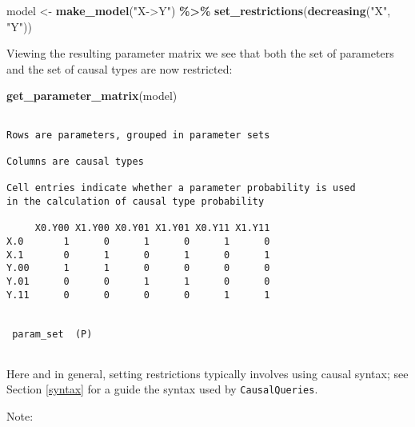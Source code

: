 \documentclass[
  12pt,
]{book}
\newenvironment{Shaded}{\begin{snugshade}}{\end{snugshade}}
\newcommand{\FunctionTok}[1]{\textcolor[rgb]{0.13,0.29,0.53}{\textbf{#1}}}
\newcommand{\NormalTok}[1]{#1}
\newcommand{\OtherTok}[1]{\textcolor[rgb]{0.56,0.35,0.01}{#1}}
\newcommand{\SpecialCharTok}[1]{\textcolor[rgb]{0.81,0.36,0.00}{\textbf{#1}}}
\newcommand{\StringTok}[1]{\textcolor[rgb]{0.31,0.60,0.02}{#1}}
\begin{document}
\begin{Shaded}
\begin{Highlighting}[]
\NormalTok{model }\OtherTok{\textless{}{-}} \FunctionTok{make\_model}\NormalTok{(}\StringTok{"X{-}\textgreater{}Y"}\NormalTok{) }\SpecialCharTok{\%\textgreater{}\%} \FunctionTok{set\_restrictions}\NormalTok{(}\FunctionTok{decreasing}\NormalTok{(}\StringTok{"X"}\NormalTok{, }\StringTok{"Y"}\NormalTok{))}
\end{Highlighting}
\end{Shaded}

Viewing the resulting parameter matrix we see that both the set of parameters and the set of causal types are now restricted:

\begin{Shaded}
\begin{Highlighting}[]
\FunctionTok{get\_parameter\_matrix}\NormalTok{(model)}
\end{Highlighting}
\end{Shaded}

\begin{verbatim}

Rows are parameters, grouped in parameter sets

Columns are causal types

Cell entries indicate whether a parameter probability is used
in the calculation of causal type probability

     X0.Y00 X1.Y00 X0.Y01 X1.Y01 X0.Y11 X1.Y11
X.0       1      0      1      0      1      0
X.1       0      1      0      1      0      1
Y.00      1      1      0      0      0      0
Y.01      0      0      1      1      0      0
Y.11      0      0      0      0      1      1

 
 param_set  (P)
 
\end{verbatim}

Here and in general, setting restrictions typically involves using causal syntax; see Section \ref{syntax} for a guide the syntax used by \texttt{CausalQueries}.

Note:
\end{document}
